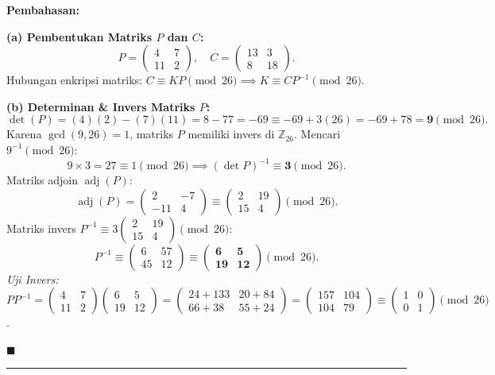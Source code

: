\documentclass[11pt,a4paper]{article}
\newenvironment{solusi}{\noindent\textbf{\textsf{Pembahasan:}}\par\vspace{0.2em}}{\hfill$\blacksquare$\vspace{1em}\par\hrule\vspace{1em}}
\begin{document}
\begin{solusi}
\textbf{(a) Pembentukan Matriks $P$ dan $C$:}
\[
P = \begin{pmatrix} 4 & 7 \\ 11 & 2 \end{pmatrix}, \quad C = \begin{pmatrix} 13 & 3 \\ 8 & 18 \end{pmatrix}.
\]
Hubungan enkripsi matriks: $C \equiv K P \pmod{26} \implies K \equiv C P^{-1} \pmod{26}$.

\vspace{0.2cm}
\textbf{(b) Determinan \& Invers Matriks $P$:}
\[
\det(P) = (4)(2) - (7)(11) = 8 - 77 = -69 \equiv -69 + 3(26) = -69 + 78 = \mathbf{9} \pmod{26}.
\]
Karena $\gcd(9, 26) = 1$, matriks $P$ memiliki invers di $\mathbb{Z}_{26}$.
Mencari $9^{-1} \pmod{26}$:
\[
9 \times 3 = 27 \equiv 1 \pmod{26} \implies (\det P)^{-1} \equiv \mathbf{3} \pmod{26}.
\]
Matriks adjoin $\operatorname{adj}(P)$:
\[
\operatorname{adj}(P) = \begin{pmatrix} 2 & -7 \\ -11 & 4 \end{pmatrix} \equiv \begin{pmatrix} 2 & 19 \\ 15 & 4 \end{pmatrix} \pmod{26}.
\]
Matriks invers $P^{-1} \equiv 3 \begin{pmatrix} 2 & 19 \\ 15 & 4 \end{pmatrix} \pmod{26}$:
\[
P^{-1} \equiv \begin{pmatrix} 6 & 57 \\ 45 & 12 \end{pmatrix} \equiv \mathbf{\begin{pmatrix} 6 & 5 \\ 19 & 12 \end{pmatrix}} \pmod{26}.
\]
\textit{Uji Invers:} $P P^{-1} = \begin{pmatrix} 4 & 7 \\ 11 & 2 \end{pmatrix} \begin{pmatrix} 6 & 5 \\ 19 & 12 \end{pmatrix} = \begin{pmatrix} 24 + 133 & 20 + 84 \\ 66 + 38 & 55 + 24 \end{pmatrix} = \begin{pmatrix} 157 & 104 \\ 104 & 79 \end{pmatrix} \equiv \begin{pmatrix} 1 & 0 \\ 0 & 1 \end{pmatrix} \pmod{26}$.


\end{solusi}
\end{document}
